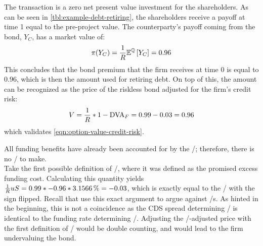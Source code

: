 \documentclass[main.tex]{subfiles}
\begin{document}
            The transaction is a zero net present value investment for the shareholders. 
            As can be seen in \cref{tbl:example-debt-retiring}, 
            the shareholders receive a payoff at time 1 equal to the pre-project value.
            The counterparty's payoff coming from the bond, $Y_C$, has a market value of:
            \begin{equation*}
                \pi(Y_{C}) = \frac{1}{R} \mathbb{E}^{\mathbb{Q}}\left[Y_{C}\right] = \num{0.96}
            \end{equation*}
            This concludes that the bond premium that the firm receives at time 0 is equal to $\num{0.96}$, 
            which is then the amount used for retiring debt. 
            On top of this, the amount can be recognized 
            as the price of the riskless bond adjusted for the firm's credit risk:
            \begin{equation*}
                V = \discountfactor * 1 - \DVA/_F = \num{0.99} - \num{0.03} = \num{0.96}
            \end{equation*}
            which validates \cref{eqn:option-value-credit-risk}. 

            All funding benefits have already been accounted for by the \DVA/;
            therefore, there is no \FVA/ to make.
            \\
            Take the first possible definition of \FVA/, 
            where it was defined as the promised excess funding cost.
            Calculating this quantity yields 
            $\discountfactor u S = \num{0.99} * \num{-0.96} * \pct{0.031566} = \num{-0.03}$,
            which is exactly equal to the \DVA/ with the sign flipped.
            Recall that \textcite{HullWhite2012FVA} use this exact argument to argue against \FVA/s.
            As hinted in the beginning, 
            this is not a coincidence as the CDS spread determining \DVA/
            is identical to the funding rate determining \FVA/.
            Adjusting the \DVA/-adjusted price with the first definition of \FVA/ would be double counting,
            and would lead to the firm undervaluing the bond.
            
\end{document}
